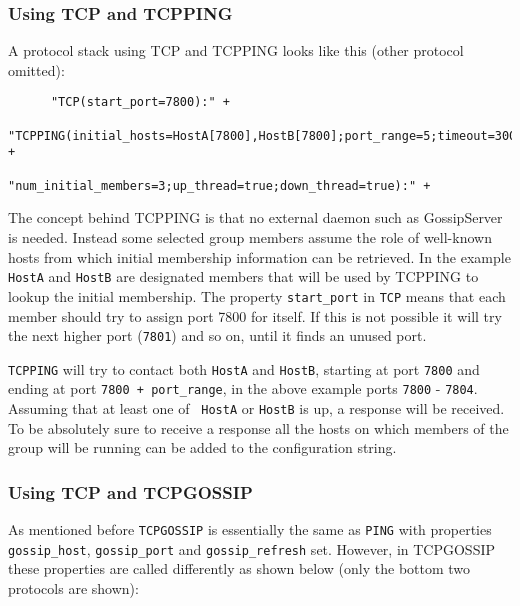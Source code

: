       \subsubsection{Using TCP and TCPPING}
      
      A protocol stack using TCP and TCPPING looks like this (other protocol
      omitted):

      \begin{small}
      \begin{verbatim}
      "TCP(start_port=7800):" +
      "TCPPING(initial_hosts=HostA[7800],HostB[7800];port_range=5;timeout=3000;" +
               "num_initial_members=3;up_thread=true;down_thread=true):" +
      \end{verbatim}
      \end{small}
      
      The concept behind TCPPING is that no external daemon such as GossipServer is
      needed. Instead some selected group members assume the role of well-known hosts
      from which initial membership information can be retrieved. In the example {\tt
      HostA} and {\tt HostB} are designated members that will be used by TCPPING to
      lookup the initial membership. The property {\tt start\_port} in {\tt TCP}
      means that each member should try to assign port 7800 for itself. If this is
      not possible it will try the next higher port ({\tt 7801}) and so on, until it
      finds an unused port.
      
      {\tt TCPPING} will try to contact both {\tt HostA} and {\tt HostB}, starting at
      port {\tt 7800} and ending at port {\tt 7800 + port\_range}, in the above
      example ports {\tt 7800} - {\tt 7804}. Assuming that at least one of {\tt
      HostA} or {\tt HostB} is up, a response will be received. To be absolutely sure
      to receive a response all the hosts on which members of the group will be
      running can be added to the configuration string.




      \subsubsection{Using TCP and TCPGOSSIP}

      As mentioned before {\tt TCPGOSSIP} is essentially the same as {\tt PING} with
      properties {\tt gossip\_host}, {\tt gossip\_port} and {\tt gossip\_refresh}
      set. However, in TCPGOSSIP these properties are called differently as shown
      below (only the bottom two protocols are shown):

